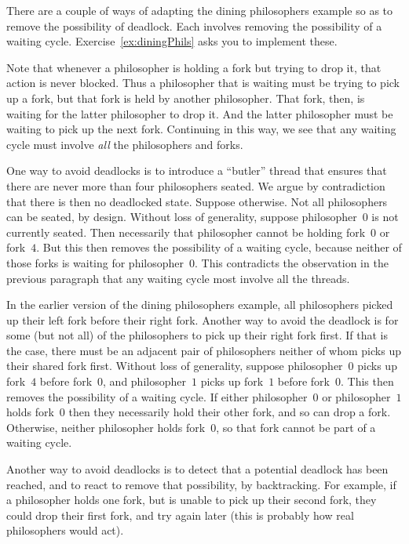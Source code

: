 There are a couple of ways of adapting the dining philosophers example so as
to remove the possibility of deadlock.  Each involves removing the possibility
of a waiting cycle.  Exercise~\ref{ex:diningPhils} asks you to implement
these. 

Note that whenever a philosopher is holding a fork but trying to drop it, that
action is never blocked.  Thus a philosopher that is waiting must be trying to
pick up a fork, but that fork is held by another philosopher.  That fork,
then, is waiting for the latter philosopher to drop it.  And the latter
philosopher must be waiting to pick up the next fork.  Continuing in this way,
we see that any waiting cycle must involve \emph{all} the philosophers and
forks. 

One way to avoid deadlocks is to introduce a ``butler'' thread that ensures
that there are never more than four philosophers seated.  We argue by
contradiction that there is then no deadlocked state.  Suppose otherwise.  Not
all philosophers can be seated, by design.  Without loss of generality,
suppose philosopher~$0$ is not currently seated.  Then necessarily that
philosopher cannot be holding fork~$0$ or fork~$4$.  But this then removes the
possibility of a waiting cycle, because neither of those forks is waiting for
philosopher~$0$.  This contradicts the observation in the previous paragraph
that any waiting cycle most involve all the threads.

In the earlier version of the dining philosophers example, all philosophers
picked up their left fork before their right fork.  Another way to avoid the
deadlock is for some (but not all) of the philosophers to pick up their right
fork first.  If that is the case, there must be an adjacent pair of
philosophers neither of whom picks up their shared fork first.  Without loss
of generality, suppose philosopher~$0$ picks up fork~$4$ before fork~$0$, and
philosopher~$1$ picks up fork~$1$ before fork~$0$.  This then removes the
possibility of a waiting cycle.  If either philosopher~$0$ or philosopher~$1$
holds fork~$0$ then they necessarily hold their other fork, and so can drop a
fork.  Otherwise, neither philosopher holds fork~$0$, so that fork cannot be
part of a waiting cycle.

Another way to avoid deadlocks is to detect that a potential deadlock has been
reached, and to react to remove that possibility, by backtracking.  For
example, if a philosopher holds one fork, but is unable to pick up their
second fork, they could drop their first fork, and try again later (this is
probably how real philosophers would act).

